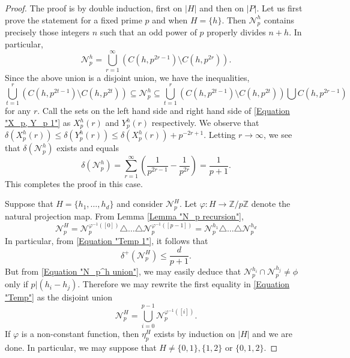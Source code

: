 \documentclass[12pt, a4paper]{amsart}
\theoremstyle{remark}
\theoremstyle{proof}
\numberwithin{equation}{section}
\numberwithin{assumption}{section}
\newcommand{\Z}{\mathbb{Z}}
\begin{document}
	\begin{proof}
		The proof is by double induction, first on $|H|$ and then on $|P|$. Let us first prove the statement for a fixed prime $p$ and when $H=\{h\}$. Then $\mathcal{N}_p^h$ contains precisely those integers $n$ such that an odd power of $p$ properly divides $n+h$. In particular,
		\begin{equation}\label{Equation "N_p^h union"}
			\mathcal{N}_p^h = \bigcup_{r=1}^{\infty} \left(C(h, p^{2r-1})\setminus C(h, p^{2r})\right).
		\end{equation}
		Since the above union is a disjoint union, we have the inequalities,
		\begin{equation}\label{Equation "X_p, Y_p 1"}
			\bigcup_{t=1}^{r} \left(C(h, p^{2t-1})\setminus C(h, p^{2t})\right) \subseteq \mathcal{N}_p^h \subseteq \bigcup_{t=1}^{r}\left( C(h, p^{2t-1})\setminus C(h, p^{2t})\right) \bigcup C(h, p^{2r-1})
		\end{equation}
		for any $r$. Call the sets on the left hand side and right hand side of \eqref{Equation "X_p, Y_p 1"} as $X_p^h(r)$ and $Y_p^h(r)$ respectively. We observe that $\delta(X_p^h(r))\leqslant \delta(Y_p^h(r))\leqslant \delta(X_p^h(r)) + p^{-2r+1}$. Letting $r\to\infty$, we see that $\delta(\mathcal{N}_p^h)$ exists and equals
		\begin{equation}\label{Equation "Temp 1"}
			\delta\left(\mathcal{N}_p^h\right) = \sum_{r=1}^{\infty} \left(\frac{1}{p^{2r-1}} - \frac{1}{p^{2r}}\right)= \frac{1}{p+1}.
		\end{equation}
		This completes the proof in this case.
		
		Suppose that $H= \{h_1,\ldots,h_d\}$ and consider $\mathcal{N}_p^H$. Let $\varphi : H\to \Z/p\Z$ denote the natural projection map. From Lemma \ref{Lemma "N_p recursion"},
		\begin{equation}\label{Equation "Temp"}
			\mathcal{N}_p^H =  \mathcal{N}_p^{\varphi^{-1}([0])}\triangle\ldots \triangle \mathcal{N}_p^{\varphi^{-1}([p-1])} = \mathcal{N}_p^{h_1}\triangle\ldots \triangle \mathcal{N}_p^{h_d}
		\end{equation}
		In particular, from \eqref{Equation "Temp 1"}, it follows that 
		\begin{equation}\label{Equation "eta_p evaluation"}
			\delta^+\left(\mathcal{N}_p^H\right)\leqslant \frac{d}{p+1}.
		\end{equation}
		But from \eqref{Equation "N_p^h union"}, we may easily deduce that $\mathcal{N}_p^{h_i}\cap \mathcal{N}_p^{h_j}\neq \phi$ only if $p| (h_i-h_j)$. Therefore we may rewrite the first equality in \eqref{Equation "Temp"} as the disjoint union
		\begin{equation}\label{Equation "Disjoint union"}
			\mathcal{N}_p^H = \bigcup_{i=0}^{p-1} \mathcal{N}_p^{\varphi^{-1}([i])}.
		\end{equation}
		If $\varphi$ is a non-constant function, then $\eta_p^H$ exists by induction on $|H|$ and we are done. In particular, we may suppose that $H\neq \{0,1\},\{1,2\}$ or $\{0,1,2\}$. 
		

\end{proof}
\end{document}
